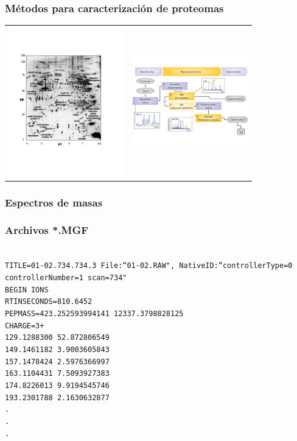 \documentclass[10pt]{beamer}
\begin{document}
\begin{frame}
\frametitle{Métodos para caracterización de proteomas}
\begin{center}
\begin{tabular}{cc}
\includegraphics[width=5cm]{imagenes/2DPAGE}&\includegraphics[width=5cm]{imagenes/WF}\\
\end{tabular}
\end{center}
\end{frame}
\begin{frame}
\frametitle{Espectros de masas}
\end{frame}
\begin{frame}
\frametitle{Archivos *.MGF}
\texttt{
\\
TITLE=01-02.734.734.3 File:``01-02.RAW", NativeID:``controllerType=0 controllerNumber=1 scan=734"\\
BEGIN IONS\\
RTINSECONDS=810.6452\\
PEPMASS=423.252593994141 12337.3798828125\\
CHARGE=3+\\
129.1288300 52.872806549 \\
149.1461182 3.9003605843 \\
157.1478424 2.5976366997 \\
163.1104431 7.5093927383 \\
174.8226013 9.9194545746 \\
193.2301788 2.1630632877 \\
.\\
.\\
.\\
}
\end{frame}
\end{document}
